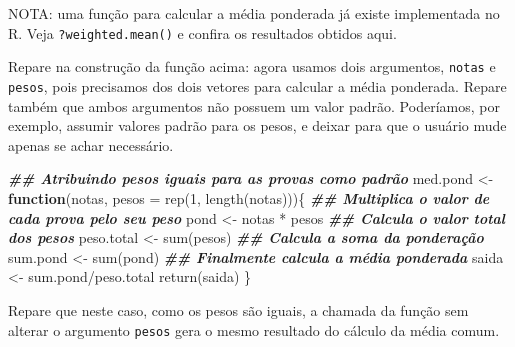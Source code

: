 \documentclass[
  10pt,
  a4paper]{book}
\newenvironment{Shaded}{\begin{snugshade}}{\end{snugshade}}
\newcommand{\AttributeTok}[1]{\textcolor[rgb]{0.77,0.63,0.00}{#1}}
\newcommand{\ControlFlowTok}[1]{\textcolor[rgb]{0.13,0.29,0.53}{\textbf{#1}}}
\newcommand{\DecValTok}[1]{\textcolor[rgb]{0.00,0.00,0.81}{#1}}
\newcommand{\DocumentationTok}[1]{\textcolor[rgb]{0.56,0.35,0.01}{\textbf{\textit{#1}}}}
\newcommand{\FunctionTok}[1]{\textcolor[rgb]{0.00,0.00,0.00}{#1}}
\newcommand{\NormalTok}[1]{#1}
\newcommand{\OtherTok}[1]{\textcolor[rgb]{0.56,0.35,0.01}{#1}}
\newcommand{\SpecialCharTok}[1]{\textcolor[rgb]{0.00,0.00,0.00}{#1}}
\begin{document}
NOTA: uma função para calcular a média ponderada já existe
implementada no R. Veja \texttt{?weighted.mean()} e confira os resultados
obtidos aqui.

Repare na construção da função acima: agora usamos dois argumentos,
\texttt{notas} e \texttt{pesos}, pois precisamos dos dois vetores para calcular a média
ponderada. Repare também que ambos argumentos não possuem um valor
padrão. Poderíamos, por exemplo, assumir valores padrão para os pesos, e
deixar para que o usuário mude apenas se achar necessário.

\begin{Shaded}
\begin{Highlighting}[]
\DocumentationTok{\#\# Atribuindo pesos iguais para as provas como padrão}
\NormalTok{med.pond }\OtherTok{\textless{}{-}} \ControlFlowTok{function}\NormalTok{(notas, }\AttributeTok{pesos =} \FunctionTok{rep}\NormalTok{(}\DecValTok{1}\NormalTok{, }\FunctionTok{length}\NormalTok{(notas)))\{}
    \DocumentationTok{\#\# Multiplica o valor de cada prova pelo seu peso}
\NormalTok{    pond }\OtherTok{\textless{}{-}}\NormalTok{ notas }\SpecialCharTok{*}\NormalTok{ pesos}
    \DocumentationTok{\#\# Calcula o valor total dos pesos}
\NormalTok{    peso.total }\OtherTok{\textless{}{-}} \FunctionTok{sum}\NormalTok{(pesos)}
    \DocumentationTok{\#\# Calcula a soma da ponderação}
\NormalTok{    sum.pond }\OtherTok{\textless{}{-}} \FunctionTok{sum}\NormalTok{(pond)}
    \DocumentationTok{\#\# Finalmente calcula a média ponderada}
\NormalTok{    saida }\OtherTok{\textless{}{-}}\NormalTok{ sum.pond}\SpecialCharTok{/}\NormalTok{peso.total}
    \FunctionTok{return}\NormalTok{(saida)}
\NormalTok{\}}
\end{Highlighting}
\end{Shaded}

Repare que neste caso, como os pesos são iguais, a chamada da função sem
alterar o argumento \texttt{pesos} gera o mesmo resultado do cálculo da média
comum.
\end{document}
